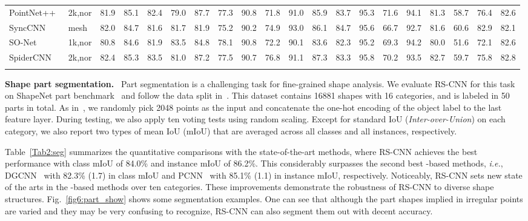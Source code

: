\documentclass[10pt,twocolumn,letterpaper]{article}
\begin{document}
\begin{table*}[t]
\begin{tabular}{p{1.8cm}|p{0.7cm}|p{0.5cm}|p{0.75cm}|p{0.32cm}p{0.32cm}p{0.32cm}p{0.32cm}p{0.32cm}p{0.32cm}p{0.32cm}p{0.32cm}p{0.32cm}p{0.32cm}p{0.32cm}p{0.32cm}p{0.32cm}p{0.32cm}p{0.32cm}p{0.32cm}}
  \Xhline{0.5pt}
\scriptsize{PointNet++}~\cite{c2_pointnet2} & 2k,nor & 81.9 & 85.1 & 82.4 & 79.0 & 87.7 & 77.3 & 90.8 & 71.8 & 91.0 & 85.9 & 83.7 & 95.3 & 71.6 & 94.1 & 81.3 & 58.7 & 76.4 & 82.6 \\
  SyncCNN~\cite{c3_synccnn} & mesh & 82.0 & 84.7 & 81.6 & 81.7 & 81.9 & 75.2 & 90.2 & 74.9 & 93.0 & 86.1 & 84.7 & 95.6 & 66.7 & 92.7 & 81.6 & 60.6 & 82.9 & 82.1 \\
SO-Net~\cite{c20} & 1k,nor & 80.8 & 84.6 & 81.9 & 83.5 & 84.8 & 78.1 & 90.8 & 72.2 & 90.1 & 83.6 & 82.3 & 95.2 & 69.3 & 94.2 & 80.0 & 51.6 & 72.1 & 82.6 \\
  \scriptsize{SpiderCNN}~\cite{c21} & 2k,nor & 82.4 & 85.3 & 83.5 & 81.0 & 87.2 & 77.5 & 90.7 & 76.8 & 91.1 & 87.3 & 83.3 & 95.8 & 70.2 & 93.5 & 82.7 & 59.7 & 75.8 & 82.8 \\
  \Xhline{0.8pt}
  \end{tabular}
  \label{Tab2:seg}
\end{table*}

\vspace{10pt}
\noindent \textbf{Shape part segmentation.}\,\,~Part segmentation is a challenging task for fine-grained shape analysis. We evaluate RS-CNN for this task on ShapeNet part benchmark~\cite{c54} and follow the data split in~\cite{c1_pointnet}. This dataset contains 16881 shapes with 16 categories, and is labeled in 50 parts in total. As in~\cite{c1_pointnet}, we randomly pick 2048 points as the input and concatenate the one-hot encoding of the object label to the last feature layer. During testing, we also apply ten voting tests using random scaling. Except for standard IoU (\textit{Inter-over-Union}) on each category, we also report two types of mean IoU (mIoU) that are averaged across all classes and all instances, respectively.

Table~\ref{Tab2:seg} summarizes the quantitative comparisons with the state-of-the-art methods, where RS-CNN achieves the best performance with class mIoU of 84.0\% and instance mIoU of 86.2\%. This considerably surpasses the second best -based methods, \textit{i.e.}, DGCNN~\cite{c22} with 82.3\% (1.7) in class mIoU and PCNN~\cite{c16_eocnn} with 85.1\% (1.1) in instance mIoU, respectively. Noticeably, RS-CNN sets new state of the arts in the -based methods over ten categories. These improvements demonstrate the robustness of RS-CNN to diverse shape structures. Fig.~\ref{fig6:part_show} shows some segmentation examples. One can see that although the part shapes implied in irregular points are varied and they may be very confusing to recognize, RS-CNN can also segment them out with decent accuracy.
\end{document}
